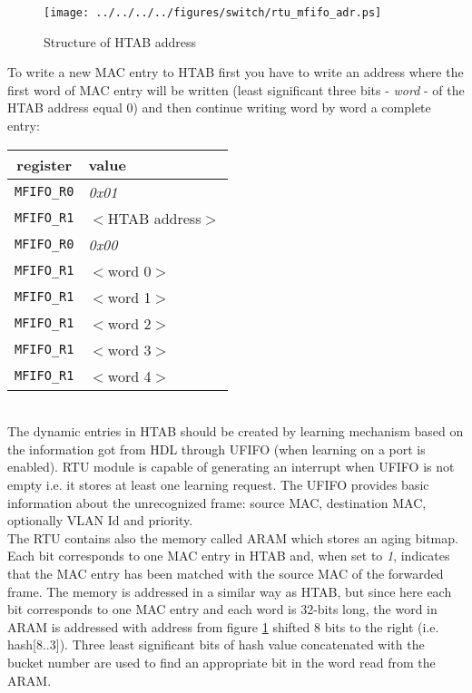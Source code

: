 \begin{figure}[ht]
  \begin{center}
    \texttt{[image: ../../../../figures/switch/rtu\_mfifo\_adr.ps]}
  \end{center}
  \caption{Structure of HTAB address}
  \label{fig:rtu:htab_adr}
\end{figure}

To write a new MAC entry to HTAB first you have to write an address where the
first word of MAC entry will be written (least significant three bits -
\emph{word} - of the HTAB address equal 0) and then continue writing word by
word a complete entry:

\begin{tabular}{c|l}
  {\bf register} & {\bf value}\\
  \hline
  \texttt{MFIFO\_R0} & \emph{0x01}\\
  \texttt{MFIFO\_R1} & $<$HTAB address$>$\\
  \texttt{MFIFO\_R0} & \emph{0x00}\\
  \texttt{MFIFO\_R1} & $<$word 0$>$\\
  \texttt{MFIFO\_R1} & $<$word 1$>$\\
  \texttt{MFIFO\_R1} & $<$word 2$>$\\
  \texttt{MFIFO\_R1} & $<$word 3$>$\\
  \texttt{MFIFO\_R1} & $<$word 4$>$\\
\end{tabular}\\

The dynamic entries in HTAB should be created by learning mechanism based on the
information got from HDL through UFIFO (when learning on a port is enabled). RTU
module is capable of generating an interrupt when UFIFO is not empty i.e. it
stores at least one learning request. The UFIFO provides basic information
about the unrecognized frame: source MAC, destination MAC, optionally VLAN Id
and priority.\\

The RTU contains also the memory called ARAM which stores an aging bitmap. Each
bit corresponds to one MAC entry in HTAB and, when set to \emph{1}, indicates
that the MAC entry has been matched with the source MAC of the forwarded frame. The
memory is addressed in a similar way as HTAB, but since here each bit
corresponds to one MAC entry and each word is 32-bits long, the word in ARAM
is addressed with address from figure \ref{fig:rtu:htab_adr} shifted 8 bits to
the right (i.e. hash[8..3]). Three least significant bits of hash value
concatenated with the bucket number are used to find an appropriate bit in the word
read from the ARAM.\\

